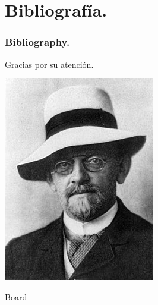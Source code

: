 \documentclass[9pt]{beamer}
\begin{document}
\section{Bibliografía.}

\begin{frame}[allowframebreaks]
	\frametitle{Bibliography.}
	
	
	 
  \nocite{*}
	
\end{frame}



\begin{frame}
\begin{center}
  \Huge {\color{red} Gracias por su atención.} 
  \begin{center}
	  \includegraphics[scale=0.5]{Hilbert.jpg}
  \end{center}
\end{center}
    
\end{frame}
\begin{frame}{Board}
\end{frame}
\end{document}
